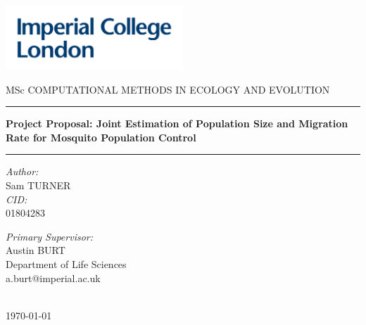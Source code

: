 \documentclass[11pt, a4paper]{article}
\begin{document}
    \begin{titlepage}
	\center
	\includegraphics[width=0.5\textwidth]{imperial.png}\par\vspace{1cm}
	\vspace{1cm}
	MSc COMPUTATIONAL METHODS IN ECOLOGY AND EVOLUTION
	\vspace{1cm}
	
	\rule{\linewidth}{0.5mm}
	{\Large\bfseries Project Proposal: Joint Estimation of Population Size and Migration Rate for Mosquito Population Control\par}
	\rule{\linewidth}{0.5mm}
	
	\vspace{1cm}


    \begin{minipage}{0.4\textwidth}
    \begin{flushleft} \large
    \emph{Author:}\\
    Sam TURNER\\
    \emph{CID:}\\
    01804283
    \end{flushleft}
    \end{minipage}
    \begin{minipage}{0.4\textwidth}
    \begin{flushright} \large
    \emph{Primary Supervisor:} \\
    Austin BURT \\    Department of Life Sciences\\
    a.burt@imperial.ac.uk
    \end{flushright}
    \end{minipage}\\[1cm]
    {\large \today}\\[0.5cm] 
    \vfill
    \newpage
    \end{titlepage}
    
\end{document}
